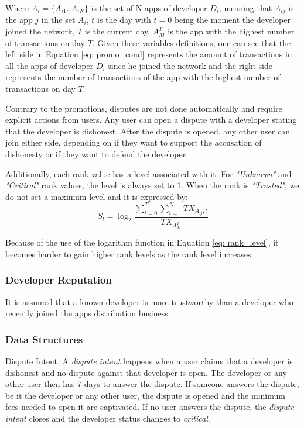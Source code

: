 Where $A_i = \{A_{i1}..A_{iN}\}$ is the set of N apps of developer $D_i$, meaning that $A_{ij}$ is the app $j$ in the set $A_i$, $t$ is the day with $t=0$ being the moment the developer joined the network, $T$ is the current day, $A^{T}_{M}$ is the app with the highest number of transactions on day $T$. Given these variables definitions, one can see that the left side in Equation \ref{eq: promo_cond} represents the amount of transactions in all the apps of developer $D_i$ since he joined the network and the right side represents the number of transactions of the app with the highest number of transactions on day $T$.

Contrary to the promotions, disputes are not done automatically and require explicit actions from users. Any user can open a dispute with a developer stating that the developer is dishonest. After the dispute is opened, any other user can join either side, depending on if they want to support the accusation of dishonesty or if they want to defend the developer.

Additionally, each rank value has a level associated with it. For \textit{"Unknown"} and \textit{"Critical"} rank values, the level is always set to 1. When the rank is \textit{"Trusted"}, we do not set a maximum level and it is expressed by:
\begin{equation}
S_l = \log_2 \frac{\sum\limits_{t=0}^{T} \sum\limits_{i=1}^{N} TX_{A_{ij},t}}{TX_{A^{T}_{M}}}
\label{eq: rank_level}
\end{equation}

Because of the use of the logarithm function in Equation \ref{eq: rank_level}, it becomes harder to gain higher rank levels as the rank level increases.

\subsubsection{Developer Reputation}

It is assumed that a known developer is more trustworthy than a developer who recently joined the apps distribution business.

\subsubsection{Data Structures}

\noindent \textsf{Dispute Intent}. A \textit{dispute intent} happens when a user claims that a developer is dishonest and no dispute against that developer is open. The developer or any other user then has 7 days to answer the dispute. If someone answers the dispute, be it the developer or any other user, the dispute is opened and the minimum fees needed to open it are captivated. If no user answers the dispute, the \textit{dispute intent} closes and the developer status changes to \textit{critical}. \\

